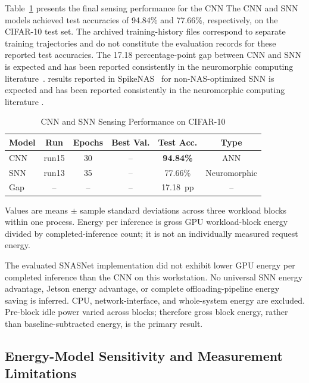 \documentclass[journal]{IEEEtran}
\begin{document}
Table~\ref{tab:sensing} presents the final sensing performance for the CNN
The CNN and SNN models achieved test accuracies of 94.84\% and 77.66\%, respectively, on the CIFAR-10 test set.
The archived training-history files correspond to separate training trajectories and do not constitute the evaluation records for these reported test accuracies.
The 17.18 percentage-point gap between CNN and SNN is expected and has been reported consistently in the neuromorphic computing literature~\cite{putra2025spikenas,di2024ec,11201000,majumdar2025spiking}.
results reported in SpikeNAS~\cite{putra2025spikenas} for non-NAS-optimized
SNN is expected and has been reported consistently in the neuromorphic
computing literature \cite{putra2025spikenas,di2024ec,11201000,majumdar2025spiking}.

\begin{table}[!t]
\caption{CNN and SNN Sensing Performance on CIFAR-10}
\label{tab:sensing}
\centering
\renewcommand{\arraystretch}{1.2}
\begin{tabular}{lccccc}
\toprule
Model & Run & Epochs & Best Val. & Test Acc. & Type \\
\midrule
CNN & run15 & 30 & -- & \textbf{94.84\%} & ANN \\
SNN & run13 & 35 & -- & 77.66\% & Neuromorphic \\
\midrule
Gap & -- & -- & -- & 17.18~pp & -- \\
\bottomrule
\end{tabular}
\par\smallskip
\begin{minipage}{0.98\columnwidth}
\footnotesize
Values are means $\pm$ sample standard deviations across three
workload blocks within one process. Energy per inference is gross
GPU workload-block energy divided by completed-inference count;
it is not an individually measured request energy.
\end{minipage}
\end{table}

The evaluated SNASNet implementation did not exhibit lower GPU
energy per completed inference than the CNN on this workstation.
No universal SNN energy advantage, Jetson energy advantage, or
complete offloading-pipeline energy saving is inferred.
CPU, network-interface, and whole-system energy are excluded.
Pre-block idle power varied across blocks; therefore gross block
energy, rather than baseline-subtracted energy, is the primary result.

\subsection{Energy-Model Sensitivity and Measurement Limitations}
\end{document}
